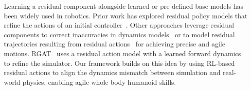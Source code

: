 Learning a residual component alongside learned or pre-defined base models has been widely used in robotics. Prior work has explored residual policy models that refine the actions of an initial controller~\cite{silver2018residual, johannink2019residual, carvalho2022residual, alakuijala2021residual, davchev2022residual, haldar2023teach, ankile2024imitation, jiang2024transic, lee2020learning}. Other approaches leverage residual components to correct inaccuracies in dynamics models~\cite{o2022neural,karnan2020reinforced,kloss2022combining,shi2021neural,he2024self} or to model residual trajectories resulting from residual actions~\cite{chi2024iterative} for achieving precise and agile motions. RGAT~\cite{karnan2020reinforced} uses a residual action model with a learned forward dynamics to refine the simulator. Our framework builds on this idea by using RL-based residual actions to align the dynamics mismatch between simulation and real-world physics, enabling agile whole-body humanoid skills.


